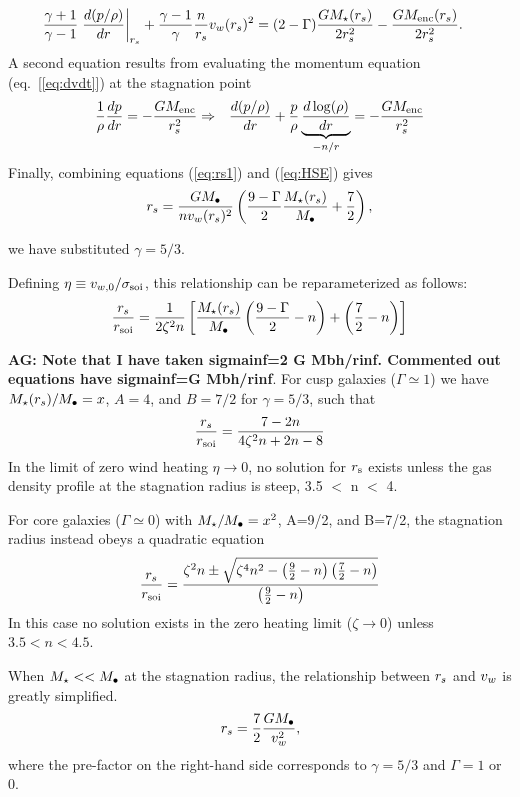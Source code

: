 \begin{align}
&\frac{\gamma+1}{\gamma-1}
\left.\frac{d (p/\rho)}{d r}\right|_{r_s}+ \frac{\gamma-1}{\gamma} \frac{n}{r_s} v_w(r_s)^{2} = (2-\Gamma) \frac{G
  M_{\star}(r_s)}{2 r_s^2} -\frac{G M_{\rm enc}(r_s)}{2 r_s^2}.  \label{eq:rs1}
\end{align}
A second equation results from evaluating the momentum equation (eq.~[\ref{eq:dvdt}]) at the stagnation point
\begin{align}
&\frac{1}{\rho}\frac{d p}{d r}=- \frac{GM_{\rm enc}}{r_s^2} \Rightarrow
&\frac{d (p/\rho)}{d r}+\frac{p}{\rho}
\underbrace{\frac{d\log(\rho)}{dr}}_{-n/r} = -\frac{G M_{\rm enc}}{r_s^2} \label{eq:HSE}
\end{align}
Finally, combining equations (\ref{eq:rs1}) and (\ref{eq:HSE}) gives 
\begin{align}
r_s=\frac{G M_{\bullet}}{n v_w(r_s)^2}\left(\frac{9-\Gamma}{2} \frac{M_{\star}(r_s)}{M_{\bullet}} +\frac{7}{2}\right),
\end{align}

we have substituted $\gamma=5/3$.

Defining $\eta \equiv v_{w,0}/\sigma_{\rm soi}$, this relationship can be reparameterized as follows:
\begin{align}
  \frac{r_s}{r_{\rm soi}}=\frac{1}{2 \zeta^2 n}\left[
   \frac{M_{\star}(r_s)}{M_{\bullet}}\left(\frac{9-\Gamma}{2}-n\right)+\left(\frac{7}{2}-n\right)\right]
\end{align}

{\bf AG: Note that I have taken sigmainf=2 G Mbh/rinf. Commented out
  equations have sigmainf=G Mbh/rinf}. For cusp galaxies ($\Gamma\simeq1$) we have $M_{\star}(r_s)/M_{\bullet}=x$, $A=4$, and $B=7/2$ for $\gamma = 5/3$, such that 
\begin{align}
\frac{r_s}{r_{\rm soi}}=\frac{7-2n}{4\zeta^2 n+2n-8}
\end{align}
In the limit of zero wind heating $\eta \rightarrow 0$, no solution for $r_{\rm s}$ exists unless the gas density profile at the stagnation radius is steep, 3.5 $<$ n $<$ 4.  

For core galaxies ($\Gamma \simeq 0$) with $M_{\star}/M_{\bullet}=x^2$, A=9/2,
and B=7/2, the stagnation radius instead obeys a quadratic equation
\begin{align}
\frac{r_s}{r_{\rm soi}}=\frac{\zeta^2 n \pm \sqrt{\zeta^4 n^2 - \left(\frac{9}{2}-n\right)
    \left(\frac{7}{2}-n\right)}}{\left(\frac{9}{2}-n\right)}
\label{eq:rstag}
\end{align}
In this case no solution exists in the zero heating limit ($\zeta \rightarrow 0$) unless $3.5<n<4.5$.

When $M_{\star} << M_{\bullet}$ at the stagnation radius, the relationship between $r_s$ and $v_w$ is greatly simplified. 
\begin{align}
r_s=\frac{7}{2}\frac{G M_{\bullet}}{v_w^2},
\end{align}
where the pre-factor on the right-hand side corresponds to
$\gamma=5/3$ and $\Gamma=1$ or 0.  



